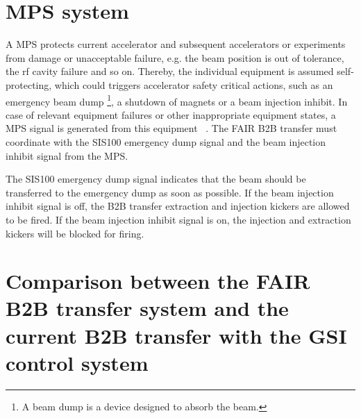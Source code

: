 \section{\gls{MPS} system}
A MPS protects current accelerator and subsequent accelerators or experiments from damage or unacceptable failure, e.g. the beam position is out of tolerance, the rf cavity failure and so on. Thereby, the individual equipment is assumed self-protecting, which could triggers accelerator safety critical actions, such as an emergency beam dump \footnote{A beam dump is a device designed to absorb the beam.}, a shutdown of magnets or a beam injection inhibit. In case of relevant equipment failures or other inappropriate equipment states, a MPS signal is generated from this equipment ~\cite{mandakovic_fair_????}. The FAIR B2B transfer must coordinate with the SIS100 emergency dump signal and the beam injection inhibit signal from the MPS. 

The SIS100 emergency dump signal indicates that the beam should be transferred to the emergency dump as soon as possible. If the beam injection inhibit signal is off, the B2B transfer extraction and injection kickers are allowed to be fired. If the beam injection inhibit signal is on, the injection and extraction kickers will be blocked for firing. 


\section{Comparison between the FAIR B2B transfer system and the current B2B transfer with the GSI control system}




